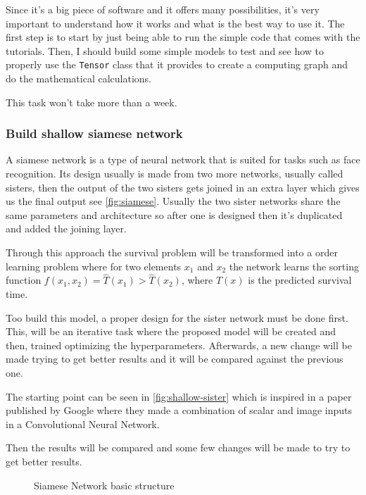 Since it's a big piece of software and it offers many possibilities, it's very important to 
understand how it works and what is the best way to use it. The first step is to start by 
just being able to run the simple code that comes with the tutorials. Then, I should build
some simple models to test and see how to properly use the \texttt{Tensor} class that it
provides to create a computing graph and do the mathematical calculations.

This task won't take more than a week.

\subsubsection{Build shallow siamese network}

A siamese network is a type of neural network that is suited for tasks such as face recognition.
Its design usually is made from two more networks, usually called sisters, then the output
of the two sisters gets joined in an extra layer which gives us the final output 
see \autoref{fig:siamese}. Usually the two sister networks share the same parameters and
architecture so after one is designed then it's duplicated and added the joining layer.

Through this approach the survival problem will be transformed into a order learning problem
where for two elements \( x_1 \) and \( x_2 \) the network learns the sorting function
\( f(x_1, x_2) = \hat{T}(x_1) > \hat{T}(x_2) \), where \( \hat{T}(x) \) is the predicted 
survival time.

Too build this model, a proper design for the sister network must be done first. This, will be
an iterative task where the proposed model will be created and then, trained optimizing
the hyperparameters. Afterwards, a new change will be made trying to get better results and
it will be compared against the previous one. 

The starting point can be seen in \autoref{fig:shallow-sister} which is inspired in a paper
\cite{neural:hand-eye-coordination} published by Google where they made a combination of 
scalar and image inputs in a Convolutional Neural Network.

Then the results will be compared and some few changes will be made to try to get better results.

\begin{figure}
  \centering
  
  \caption{Siamese Network basic structure \label{fig:siamese}}
\end{figure}

